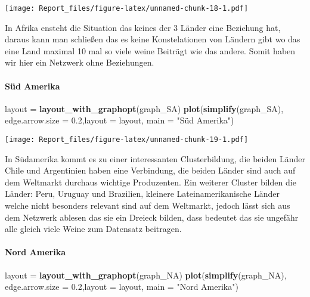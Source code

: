 \documentclass[
]{article}
\newenvironment{Shaded}{\begin{snugshade}}{\end{snugshade}}
\newcommand{\AttributeTok}[1]{\textcolor[rgb]{0.13,0.29,0.53}{#1}}
\newcommand{\FloatTok}[1]{\textcolor[rgb]{0.00,0.00,0.81}{#1}}
\newcommand{\FunctionTok}[1]{\textcolor[rgb]{0.13,0.29,0.53}{\textbf{#1}}}
\newcommand{\NormalTok}[1]{#1}
\newcommand{\OtherTok}[1]{\textcolor[rgb]{0.56,0.35,0.01}{#1}}
\newcommand{\StringTok}[1]{\textcolor[rgb]{0.31,0.60,0.02}{#1}}
\begin{document}
\texttt{[image: Report\_files/figure-latex/unnamed-chunk-18-1.pdf]}

In Afrika ensteht die Situation das keines der 3 Länder eine Beziehung
hat, daraus kann man schließen das es keine Konstelationen von Ländern
gibt wo das eine Land maximal 10 mal so viele weine Beiträgt wie das
andere. Somit haben wir hier ein Netzwerk ohne Beziehungen.

\paragraph{Süd Amerika}\label{suxfcd-amerika}

\begin{Shaded}
\begin{Highlighting}[]
\NormalTok{layout }\OtherTok{=} \FunctionTok{layout\_with\_graphopt}\NormalTok{(graph\_SA)}
\FunctionTok{plot}\NormalTok{(}\FunctionTok{simplify}\NormalTok{(graph\_SA), }\AttributeTok{edge.arrow.size =} \FloatTok{0.2}\NormalTok{,}\AttributeTok{layout =}\NormalTok{ layout, }\AttributeTok{main =} \StringTok{"Süd Amerika"}\NormalTok{)}
\end{Highlighting}
\end{Shaded}

\texttt{[image: Report\_files/figure-latex/unnamed-chunk-19-1.pdf]}

In Südamerika kommt es zu einer interessanten Clusterbildung, die beiden
Länder Chile und Argentinien haben eine Verbindung, die beiden Länder
sind auch auf dem Weltmarkt durchaus wichtige Produzenten. Ein weiterer
Cluster bilden die Länder: Peru, Uruguay und Brazilien, kleinere
Lateinamerikanische Länder welche nicht besonders relevant sind auf dem
Weltmarkt, jedoch lässt sich aus dem Netzwerk ablesen das sie ein
Dreieck bilden, dass bedeutet das sie ungefähr alle gleich viele Weine
zum Datensatz beitragen.

\paragraph{Nord Amerika}\label{nord-amerika}

\begin{Shaded}
\begin{Highlighting}[]
\NormalTok{layout }\OtherTok{=} \FunctionTok{layout\_with\_graphopt}\NormalTok{(graph\_NA)}
\FunctionTok{plot}\NormalTok{(}\FunctionTok{simplify}\NormalTok{(graph\_NA), }\AttributeTok{edge.arrow.size =} \FloatTok{0.2}\NormalTok{,}\AttributeTok{layout =}\NormalTok{ layout, }\AttributeTok{main =} \StringTok{"Nord Amerika"}\NormalTok{)}
\end{Highlighting}
\end{Shaded}
\end{document}
